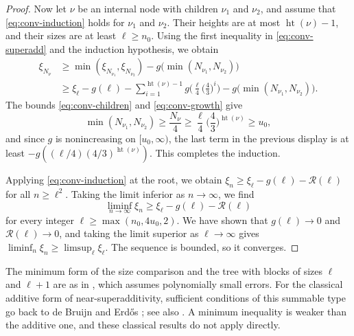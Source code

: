 \begin{proof}
Now let $\nu$ be an internal node with children $\nu_1$ and $\nu_2$, and assume that \eqref{eq:conv-induction} holds for $\nu_1$ and $\nu_2$. Their heights are at most $\operatorname{ht}(\nu) - 1$, and their sizes are at least $\ell \ge n_0$. Using the first inequality in \eqref{eq:conv-superadd} and the induction hypothesis, we obtain
\[
\begin{aligned}
\xi_{N_\nu} &\ge \min(\xi_{N_{\nu_1}}, \xi_{N_{\nu_2}}) - g\big(\min(N_{\nu_1}, N_{\nu_2})\big)\\
&\ge \xi_\ell - g(\ell) - \sum_{i = 1}^{\operatorname{ht}(\nu) - 1} g\Big(\frac \ell4 \Big(\frac 43\Big)^i\Big) - g\big(\min(N_{\nu_1}, N_{\nu_2})\big).
\end{aligned}
\]
The bounds \eqref{eq:conv-children} and \eqref{eq:conv-growth} give
\[
\min(N_{\nu_1}, N_{\nu_2}) \ge \frac{N_\nu}{4} \ge \frac \ell4 \Big(\frac 43\Big)^{\operatorname{ht}(\nu)} \ge u_0,
\]
and since $g$ is nonincreasing on $[u_0, \infty)$, the last term in the previous display is at least $-g((\ell/4)(4/3)^{\operatorname{ht}(\nu)})$. This completes the induction.

Applying \eqref{eq:conv-induction} at the root, we obtain $\xi_n \ge \xi_\ell - g(\ell) - \mathcal R(\ell)$ for all $n \ge \ell^2$. Taking the limit inferior as $n \to \infty$, we find
\[
\liminf_{n \to \infty} \xi_n \ge \xi_\ell - g(\ell) - \mathcal R(\ell)
\]
for every integer $\ell \ge \max(n_0, 4u_0, 2)$. We have shown that $g(\ell) \to 0$ and $\mathcal R(\ell) \to 0$, and taking the limit superior as $\ell \to \infty$ gives $\liminf_n \xi_n \ge \limsup_\ell \xi_\ell$. The sequence is bounded, so it converges.
\end{proof}

The minimum form of the size comparison and the tree with blocks of sizes $\ell$ and $\ell + 1$ are as in \cite[Lemma~5.4]{openai2026limiting}, which assumes polynomially small errors. For the classical additive form of near-superadditivity, sufficient conditions of this summable type go back to de Bruijn and Erd\H{o}s \cite[Theorem~23]{debruijn1952some}; see also \cite[arXiv:1006.3786v1, Section~4.3, Lemma~8 and Remark~3]{abbe2014concentration}. A minimum inequality is weaker than the additive one, and these classical results do not apply directly.

